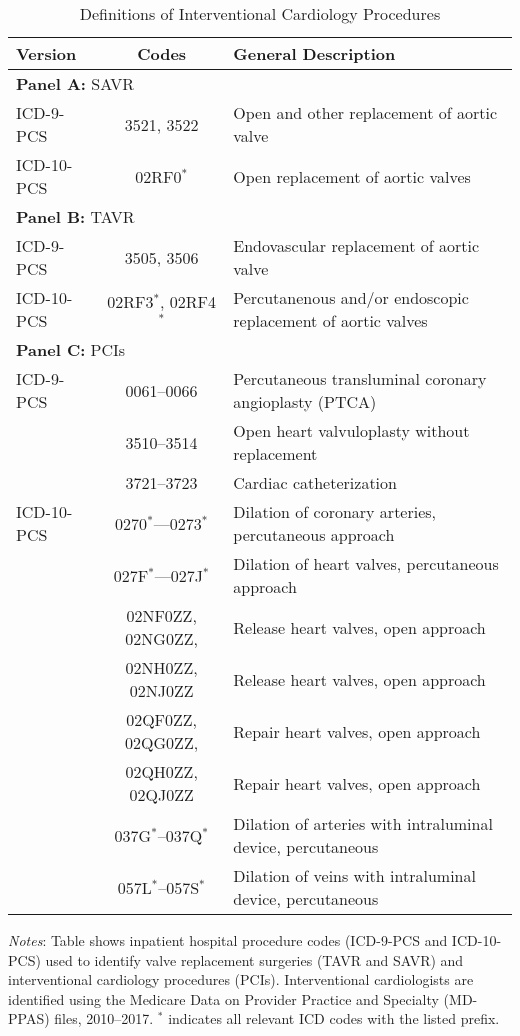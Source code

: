 \begin{table}[htbp]
    \centering
    \begin{threeparttable}
    \begin{tabular}{l|cl}
    \toprule
    Version & Codes & General Description \\
    \midrule
    \multicolumn{3}{l}{\textbf{Panel A:} SAVR} \\ 
    ICD-9-PCS & 3521, 3522 & Open and other replacement of aortic valve \\ 
    ICD-10-PCS & 02RF0$^{*}$ & Open replacement of aortic valves \\ 
    \midrule
    \multicolumn{3}{l}{\textbf{Panel B:} TAVR} \\ 
    ICD-9-PCS & 3505, 3506 & Endovascular replacement of aortic valve \\ 
    ICD-10-PCS & 02RF3$^{*}$, 02RF4$^{*}$ & Percutanenous and/or endoscopic replacement of aortic valves \\ 
    \midrule
    \multicolumn{3}{l}{\textbf{Panel C:} PCIs} \\ 
    ICD-9-PCS & 0061--0066 & Percutaneous transluminal coronary angioplasty (PTCA) \\
     & 3510--3514 & Open heart valvuloplasty without replacement \\
     & 3721--3723 & Cardiac catheterization \\
    ICD-10-PCS & 0270$^{*}$---0273$^{*}$ & Dilation of coronary arteries, percutaneous approach \\
     & 027F$^{*}$---027J$^{*}$ & Dilation of heart valves, percutaneous approach \\
     & 02NF0ZZ, 02NG0ZZ, & Release heart valves, open approach \\
    & 02NH0ZZ, 02NJ0ZZ  & Release heart valves, open approach\\
    & 02QF0ZZ, 02QG0ZZ, & Repair heart valves, open approach \\
    & 02QH0ZZ, 02QJ0ZZ  & Repair heart valves, open approach \\
     & 037G$^{*}$--037Q$^{*}$ & Dilation of arteries with intraluminal device, percutaneous \\
     & 057L$^{*}$--057S$^{*}$ & Dilation of veins with intraluminal device, percutaneous \\
    \bottomrule
    \end{tabular}
        \caption{Definitions of Interventional Cardiology Procedures\label{axtab:services}}
    \begin{tablenotes}
        \small
        \item \textit{Notes}: Table shows inpatient hospital procedure codes (ICD-9-PCS and ICD-10-PCS) used to identify valve replacement surgeries (TAVR and SAVR) and interventional cardiology procedures (PCIs). Interventional cardiologists are identified using the Medicare Data on Provider Practice and Specialty (MD-PPAS) files, 2010--2017. $^{*}$ indicates all relevant ICD codes with the listed prefix.
    \end{tablenotes}
    \end{threeparttable}
\end{table}